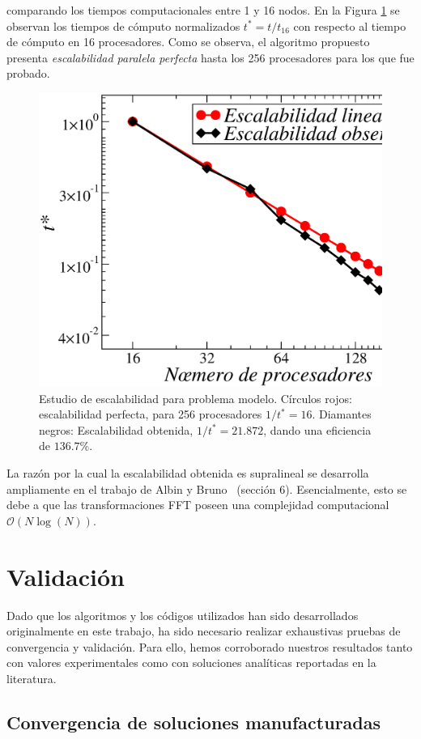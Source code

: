 comparando los tiempos computacionales entre 1 y 16 nodos. 
En la Figura \ref{fig:scala} se observan los tiempos de cómputo 
normalizados $t^*=t/t_{16}$ con respecto al tiempo de cómputo 
en 16 procesadores. 
Como se observa, el algoritmo 
propuesto presenta \textit{escalabilidad paralela perfecta} 
hasta los 256 procesadores para los que fue probado. 
\begin{figure}[h!]
\centering
  \includegraphics[width=0.5\linewidth]{figuras/escalabilidad.eps}
  \caption{Estudio de escalabilidad para problema modelo. 
  Círculos rojos: escalabilidad perfecta, para 256 procesadores $1/t^*=16$. 
  Diamantes negros: Escalabilidad obtenida, $1/t^*=21.872$, dando 
 una eficiencia de $136.7\%$.}
 \label{fig:scala}
\end{figure}

La razón por la cual la escalabilidad obtenida es supralineal se 
desarrolla ampliamente en el trabajo de Albin y Bruno~\cite{Albin2011}
(sección 6). Esencialmente, esto se debe a que 
las transformaciones FFT 
poseen una complejidad computacional $\mathcal{O}(N\log(N))$.

\section{Validación}

Dado que los algoritmos y los códigos utilizados han sido desarrollados 
originalmente en este trabajo, ha sido necesario realizar exhaustivas 
pruebas de convergencia y validación. Para ello, 
hemos corroborado nuestros resultados tanto con valores experimentales 
como con soluciones analíticas reportadas en la literatura.

\subsection{Convergencia de soluciones manufacturadas}
\label{sec:manufacturada}

